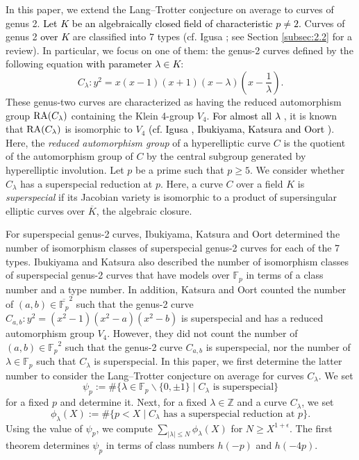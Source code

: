 \documentclass[a4paper, 11pt]{article}
\theoremstyle{plain}
\newcommand{\?}{\textcolor{red}{??}}
\newcommand{\lm}{\lambda}
\newcommand{\fp}{\mathbb{F}_p}
\newcommand{\bZ}{\mathbb{Z}}
\begin{document}
In this paper, we extend the Lang--Trotter conjecture on average to curves of genus 2. \textcolor{black}{Let $K$ be an algebraically closed field of characteristic $p \ne 2$.} Curves of genus 2 \textcolor{black}{over $K$}  are classified into 7 types (cf. Igusa \cite{Igusa}; see Section \ref{subsec:2.2} for a review). In particular, we focus on one of them: the genus-2 curves defined by the following equation \textcolor{black}{with parameter $\lm \in K$}:
\[
C_{\lm}:y^2=x(x-1)(x+1)(x-{\lambda}) \left(x-\frac{1}{\lambda}\right).
\]
 These genus-two curves are characterized as having the reduced automorphism group ${\rm RA}(C_\lambda)$ containing the Klein 4-group $V_4$. \textcolor{black}{For almost all $\lambda$} , it is known that ${\rm RA}(C_\lambda)$ is isomorphic to $V_4$ \textcolor{black}{(cf. Igusa \cite[\S 8]{Igusa}, Ibukiyama, Katsura and Oort \cite[\S 1]{IKO02})}. 
Here, the \textit{reduced automorphism group} of \textcolor{black}{a} hyperelliptic curve $C$ is the quotient of the automorphism group of $C$ by the central subgroup generated by hyperelliptic involution.
Let $p$ be a prime such that $p \ge 5$. We consider whether $C_{\lm}$ has a superspecial reduction at $p$.
Here, a curve $C$ over a field $K$ is \textit{superspecial} if its Jacobian variety is isomorphic to a product of supersingular elliptic curves over $\overline{K}$, the algebraic closure. 

For superspecial genus-2 curves, Ibukiyama, Katsura and Oort \cite{IKO02} determined the number of isomorphism classes of superspecial genus-2 curves for each of the 7 types. Ibukiyama and Katsura \cite{IKadd} also described the number of isomorphism classes of superspecial genus-2 curves that have models over $\fp$ in terms of a class number and a type number. In addition, Katsura and Oort \cite{KatsuraOort} counted the number of $(a,b) \in {\overline{\fp}}^2$ 
such that the genus-2 curve $C_{a,b}:y^2=(x^2-1)(x^2-a)(x^2-b)$ is superspecial
and has a reduced automorphism group $V_4$.
However, they did not count the number of $(a,b) \in {\fp}^2$ 
such that the genus-2 curve $C_{a,b}$ is superspecial, nor the number of $\lambda\in\fp$ such that $C_\lambda$ is superspecial.
In this paper, we first determine the latter number to consider the Lang--Trotter conjecture on average for curves $C_{\lm}$. We set
\[
{\psi}_{p} := \# \lbrace \lm \in \fp\smallsetminus \{ 0, \pm1\} \mid C_{\lm} \text{ is superspecial}  \rbrace
\]
for a fixed $p$ and determine it. Next, for a fixed $\lm \in \bZ$ and a curve $C_{\lm}$, we set
\[
{\phi}_{\lm}(X):= \# \lbrace p<X \mid C_{\lm} \text{ has a superspecial reduction at } p  \rbrace .
\]
Using the value of $\psi_p$, we compute $\sum_{\lvert \lm \rvert \le N} {\phi}_{\lm}(X)$ for $N \ge X^{1+\epsilon}$. The first theorem determines $\psi_p$ in terms of class numbers $h(-p)$ and $ h(-4p)$. 
\end{document}
